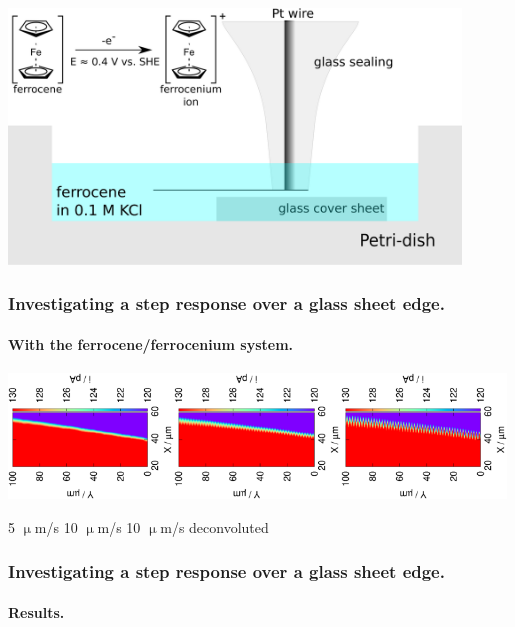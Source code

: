\documentclass{beamer}
\begin{document}
\begin{frame}
        \centering
        \includegraphics[width=0.9\textwidth]{step.eps}
        \frametitle{Investigating a step response over a glass sheet edge.}
        \framesubtitle{With the ferrocene/ferrocenium system.}
\vfill
\end{frame}

\begin{frame}
        \centering
        \includegraphics[trim = 10mm 60mm 0mm 60mm, clip, width=0.33\textwidth, angle=-90]{1.eps}\includegraphics[trim = 10mm 60mm 0mm 60mm, clip, width=0.33\textwidth, angle=-90]{2_meandered.eps}\includegraphics[trim = 10mm 60mm 0mm 60mm, clip, width=0.33\textwidth, angle=-90]{2_meandered_deconvoluted.eps}

\hspace{1.2cm} 5 $\upmu$m/s \hspace{1.2cm} 10 $\upmu$m/s \hspace{0.2cm} 10 $\upmu$m/s deconvoluted \hfill

\frametitle{Investigating a step response over a glass sheet edge.}
        \framesubtitle{Results.}
\vfill
\end{frame}
\end{document}
